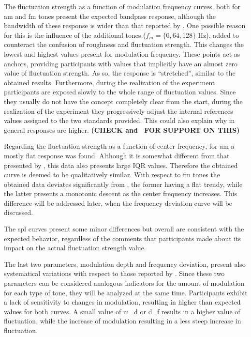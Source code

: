 \documentclass[../main.tex]{subfiles}
\begin{document}
The fluctuation strength as a function of modulation frequency curves, both for
\gls{am} and \gls{fm} tones present the expected bandpass response, although
the bandwidth of these response is wider than that reported by
\citeauthor{Fastl2007Psychoacoustics}. One possible reason for this is the
influence of the additional tones ($f_m = \{0, 64, 128\}$ Hz), added to
counteract the confusion of roughness and fluctuation strength. This changes
the lowest and highest values present for modulation frequency. These points
act as anchors, providing participants with values that implicitly have an
almost zero value of fluctuation strength. As so, the response is ``stretched'',
similar to the obtained results. Furthermore, during the realization of the
experiment participants are exposed slowly to the whole range of fluctuation
values. Since they usually do not have the concept completely clear from the
start, during the realization of the experiment they progressively adjust the
internal references values assigned to the two standards provided. This could
also explain why in general responses are higher. {\color{red} \bfseries (CHECK
\cite{Krantz1972} and~\cite{Marley1972} FOR SUPPORT ON THIS)}

Regarding the fluctuation strength as a function of center frequency, for
\gls{am} a mostly flat response was found. Although it is somewhat different
from that presented by \citeauthor{Fastl2007Psychoacoustics}, this data also
presents large \gls{IQR} values. Therefore the obtained curve is deemed to be
qualitatively similar. With respect to \gls{fm} tones the obtained data
deviates significantly from \citeauthor{Fastl2007Psychoacoustics}, the former
having a flat trendy, while the latter presents a monotonic descent as the
center frequency increases. This difference will be addressed later, when the
frequency deviation curve will be discussed.

The \gls{spl} curves present some minor differences but overall are consistent
with the expected behavior, regardless of the comments that participants made
about its impact on the actual fluctuation strength value.

The last two parameters, modulation depth and frequency deviation, present also
systematical variations with respect to those reported by
\citeauthor{Fastl2007Psychoacoustics}. Since these two parameters can be
considered analogous indicators for the amount of modulation for each type of
tone, they will be analyzed at the same time. Participants exhibit a lack of
sensitivity to changes in modulation, resulting in higher than expected values
for both curves. A small value of \gls{m_d} or \gls{d_f} results in a higher
value of fluctuation, while the increase of modulation resulting in a less
steep increase in fluctuation.
\end{document}
